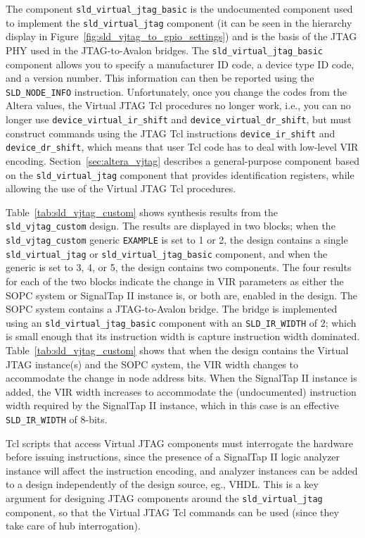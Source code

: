 \documentclass[10pt,twoside]{article}
\begin{document}
\noindent The component \verb+sld_virtual_jtag_basic+ is the undocumented
component used to implement the \verb+sld_virtual_jtag+ component
(it can be seen in the hierarchy display in 
Figure~\ref{fig:sld_vjtag_to_gpio_settings}) and is the basis
of the JTAG PHY used in the JTAG-to-Avalon bridges. 
The \verb+sld_virtual_jtag_basic+ component allows you to
specify a manufacturer ID code, a device type ID code,
and a version number. This information can then be reported
using the \verb+SLD_NODE_INFO+ instruction. Unfortunately, once
you change the codes from the Altera values, the Virtual JTAG
Tcl procedures no longer work, i.e., you can no longer use
\verb+device_virtual_ir_shift+ and \verb+device_virtual_dr_shift+,
but must construct commands using the JTAG Tcl instructions
\verb+device_ir_shift+ and \verb+device_dr_shift+, which means
that user Tcl code has to deal with low-level VIR encoding.
Section~\ref{sec:altera_vjtag} describes a general-purpose
component based on the \verb+sld_virtual_jtag+ component that
provides identification registers, while allowing the use of
the Virtual JTAG Tcl procedures.

Table~\ref{tab:sld_vjtag_custom} shows synthesis results from the
\verb+sld_vjtag_custom+ design. The results are displayed in two
blocks; when the \verb+sld_vjtag_custom+ generic \verb+EXAMPLE+
is set to 1 or 2, the design contains a single \verb+sld_virtual_jtag+
or \verb+sld_virtual_jtag_basic+ component, and when the generic is
set to 3, 4, or 5, the design contains two components. The four
results for each of the two blocks indicate the change in VIR
parameters as either the SOPC system or SignalTap II instance is,
or both are, enabled in the design. The SOPC system contains a
JTAG-to-Avalon bridge. The bridge is implemented using an 
\verb+sld_virtual_jtag_basic+ component with an \verb+SLD_IR_WIDTH+
of 2; which is small enough that its instruction width is
capture instruction width dominated. Table~\ref{tab:sld_vjtag_custom} shows 
that when the design contains the Virtual JTAG instance(s)
and the SOPC system, the VIR width changes to accommodate the
change in node address bits.
When the SignalTap II instance is added, the VIR width increases
to accommodate the (undocumented) instruction width required
by the SignalTap II instance, which in this case is an effective
\verb+SLD_IR_WIDTH+ of 8-bits.

Tcl scripts that access Virtual JTAG components must interrogate
the hardware before issuing instructions, since the presence of
a SignalTap II logic analyzer instance will affect the instruction
encoding, and analyzer instances can be added to a design independently
of the design source, eg., VHDL. This is a key argument for designing
JTAG components around the \verb+sld_virtual_jtag+ component,
so that the Virtual JTAG Tcl commands can be used
(since they take care of hub interrogation).
\end{document}

